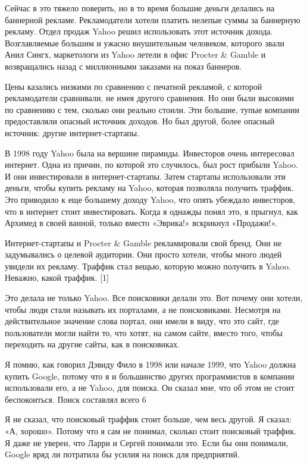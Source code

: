 \documentclass[ebook,12pt,oneside,openany]{memoir}
\begin{document}
Сейчас в это тяжело поверить, но в то время большие деньги делались на
баннерной рекламе. Рекламодатели хотели платить нелепые суммы за
баннерную рекламу. Отдел продаж Yahoo решил использовать этот источник
дохода. Возглавляемые большим и ужасно внушительным человеком,
которого звали Анил Сингх, маркетологи из Yahoo летели в офис Procter
\& Gamble и возвращались назад с миллионными заказами на показ
баннеров.

Цены казались низкими по сравнению с печатной рекламой, с которой
рекламодатели сравнивали, не имея другого сравнения. Но они были
высокими по сравнению с тем, сколько они реально стоили. Эти большие,
тупые компании предоставляли опасный источник доходов. Но был другой,
более опасный источник: другие интернет-стартапы.

В 1998 году Yahoo была на вершине пирамиды. Инвесторов очень
интересовал интернет. Одна из причин, по которой это случилось, был
рост прибыли Yahoo. И они инвестировали в интернет-стартапы. Затем
стартапы использовали эти деньги, чтобы купить рекламу на Yahoo,
которая позволяла получить траффик. Это приводило к еще большему
доходу Yahoo, что опять убеждало инвесторов, что в интернет стоит
инвестировать. Когда я однажды понял это, я прыгнул, как Архимед в
своей ванной, только вместо «Эврика!» вскрикнул «Продажи!».

Интернет-стартапы и Procter \& Gamble рекламировали свой бренд. Они не
задумывались о целевой аудитории. Они просто хотели, чтобы много людей
увидели их рекламу. Траффик стал вещью, которую можно получить в
Yahoo. Неважно, какой траффик. [1]

Это делала не только Yahoo. Все поисковики делали это. Вот почему они
хотели, чтобы люди стали называть их порталами, а не поисковиками.
Несмотря на действительное значение слова портал, они имели в виду,
что это сайт, где пользователи могли найти то, что хотят, на самом
сайте, вместо того, чтобы переходить на другие сайты, как в
поисковиках.

Я помню, как говорил Дэвиду Фило в 1998 или начале 1999, что Yahoo
должна купить Google, потому что я и большинство других программистов
в компании использовали его, а не Yahoo, для поиска. Он сказал мне,
что об этом не стоит беспокоиться. Поиск составлял всего
6%

Я не сказал, что поисковый траффик стоит больше, чем весь другой. Я
сказал: «А, хорошо». Потому что я сам не понимал, сколько стоит
поисковый траффик. Я даже не уверен, что Ларри и Сергей понимали это.
Если бы они понимали, Google вряд ли потратила бы усилия на поиск для
предприятий.
\end{document}
